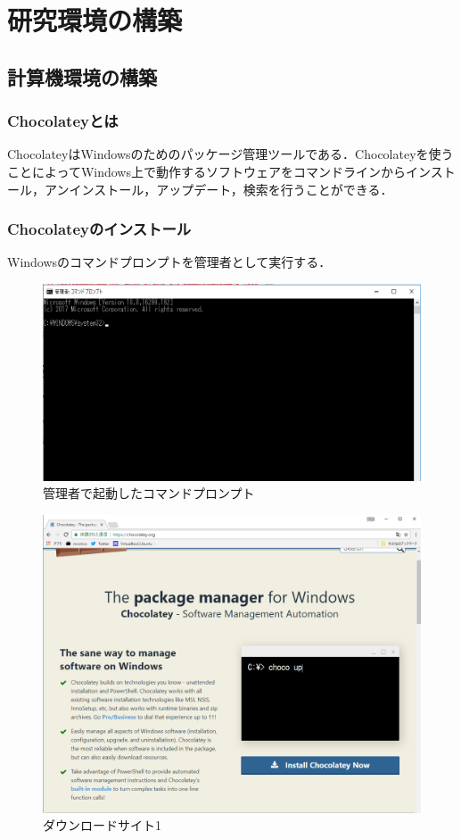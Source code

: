 \chapter{研究環境の構築}

\section{計算機環境の構築}

\subsection{Chocolateyとは}
ChocolateyはWindowsのためのパッケージ管理ツールである．Chocolateyを使うことによってWindows上で動作するソフトウェアをコマンドラインからインストール，アンインストール，アップデート，検索を行うことができる．

\subsection{Chocolateyのインストール}
Windowsのコマンドプロンプトを管理者として実行する．

\begin{figure}[h]
\centering
\includegraphics[width=13cm]{choco1.png}
\caption{管理者で起動したコマンドプロンプト}\label{サンプル図}
\end{figure}

\newpage


\begin{figure}[h]
\centering
\includegraphics[width=13cm]{choco2.png}
\caption{ダウンロードサイト1}\label{サンプル図}
\end{figure}

